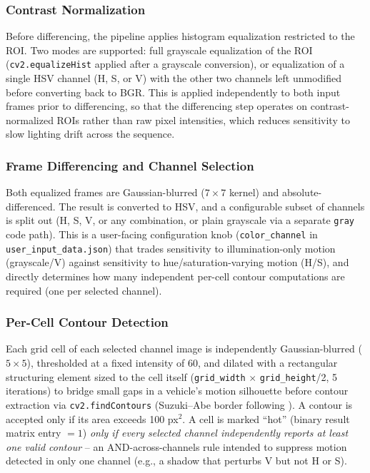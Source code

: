 \documentclass[conference]{IEEEtran}
\newcommand{\code}[1]{\texttt{#1}}
\begin{document}
\subsubsection{Contrast Normalization}
Before differencing, the pipeline applies histogram equalization
restricted to the ROI. Two modes are supported: full grayscale
equalization of the ROI (\code{cv2.equalizeHist} applied after a
grayscale conversion), or equalization of a single HSV channel (H, S,
or V) with the other two channels left unmodified before converting
back to BGR. This is applied independently to both input frames prior
to differencing, so that the differencing step operates on
contrast-normalized ROIs rather than raw pixel intensities, which
reduces sensitivity to slow lighting drift across the sequence.

\subsubsection{Frame Differencing and Channel Selection}
Both equalized frames are Gaussian-blurred ($7\times7$ kernel) and
absolute-differenced. The result is converted to HSV, and a
configurable subset of channels is split out (H, S, V, or any
combination, or plain grayscale via a separate \code{gray} code path).
This is a user-facing configuration knob (\code{color\_channel} in
\code{user\_input\_data.json}) that trades sensitivity to
illumination-only motion (grayscale/V) against sensitivity to
hue/saturation-varying motion (H/S), and directly determines how many
independent per-cell contour computations are required (one per
selected channel).

\subsubsection{Per-Cell Contour Detection}
Each grid cell of each selected channel image is independently
Gaussian-blurred ($5\times5$), thresholded at a fixed intensity of 60,
and dilated with a rectangular structuring element sized to the cell
itself (\code{grid\_width} $\times$ \code{grid\_height}/2, 5 iterations)
to bridge small gaps in a vehicle's motion silhouette before contour
extraction via \code{cv2.findContours} (Suzuki--Abe border following
\cite{suzuki1985}). A contour is accepted only if its area exceeds 100
px$^2$. A cell is marked ``hot'' (binary result matrix entry $=1$)
\emph{only if every selected channel independently reports at least one
valid contour} -- an AND-across-channels rule intended to suppress
motion detected in only one channel (e.g., a shadow that perturbs V but
not H or S).
\end{document}
